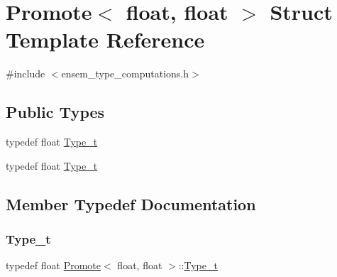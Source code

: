 \hypertarget{structPromote_3_01float_00_01float_01_4}{}\section{Promote$<$ float, float $>$ Struct Template Reference}
\label{structPromote_3_01float_00_01float_01_4}


{\ttfamily \#include $<$ensem\+\_\+type\+\_\+computations.\+h$>$}

\subsection*{Public Types}
\begin{DoxyCompactItemize}
\item 
typedef float \mbox{\hyperlink{structPromote_3_01float_00_01float_01_4_a7a0db669ca1c2569d700f8e431371d30}{Type\+\_\+t}}
\item 
typedef float \mbox{\hyperlink{structPromote_3_01float_00_01float_01_4_a7a0db669ca1c2569d700f8e431371d30}{Type\+\_\+t}}
\end{DoxyCompactItemize}


\subsection{Member Typedef Documentation}
\mbox{\label{structPromote_3_01float_00_01float_01_4_a7a0db669ca1c2569d700f8e431371d30}} 
\subsubsection{\texorpdfstring{Type\_t}{Type\_t}\hspace{0.1cm}{\footnotesize\ttfamily [1/2]}}
{\footnotesize\ttfamily typedef float \mbox{\hyperlink{structPromote}{Promote}}$<$ float, float $>$\+::\mbox{\hyperlink{structPromote_3_01float_00_01float_01_4_a7a0db669ca1c2569d700f8e431371d30}{Type\+\_\+t}}}

\mbox{\label{structPromote_3_01float_00_01float_01_4_a7a0db669ca1c2569d700f8e431371d30}} 
